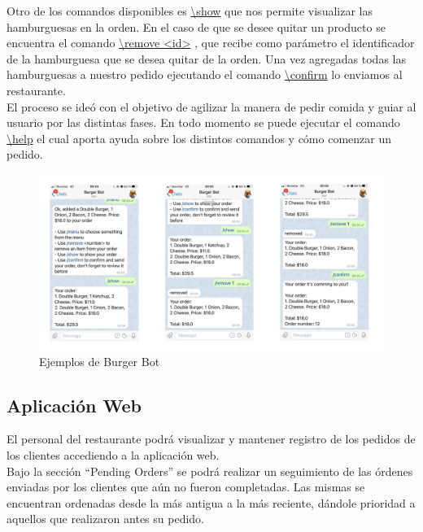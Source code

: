 \documentclass[a4paper,12pt]{article}
\begin{document}
Otro de los comandos disponibles es \color{blue}\uline{\textbackslash show} \color{black} que nos permite visualizar las hamburguesas en la orden. En el caso de que se desee quitar un producto se encuentra el comando
\color{blue}\uline{\textbackslash remove <id>}\color{black}
, que recibe como parámetro el identificador de la hamburguesa que se desea quitar de la orden. Una vez agregadas todas las hamburguesas a nuestro pedido ejecutando el comando 
\color{blue}\uline{\textbackslash confirm} \color{black} 
lo enviamos al restaurante.
\\
El proceso se ideó con el objetivo de agilizar la manera de pedir comida y guiar al usuario por las distintas fases. En todo momento se puede ejecutar el comando 
\color{blue}\uline{\textbackslash help} \color{black}
el cual aporta ayuda sobre los distintos comandos y cómo comenzar un pedido.

\begin{figure}[H]
	\centering
	\includegraphics[width=1.0\linewidth]{ejemplos-chat-bot.jpeg}
	\caption{Ejemplos de Burger Bot}
	\label{fig:Armado hamburguesa chat bot}
\end{figure}

\subsection{Aplicación Web}

El personal del restaurante podrá visualizar y mantener registro de los pedidos de los clientes accediendo a la aplicación web.
\\
Bajo la sección “Pending Orders” se podrá realizar un seguimiento de las órdenes enviadas por los clientes que aún no fueron completadas. Las mismas se encuentran ordenadas desde la más antigua a la más reciente, dándole prioridad a aquellos que realizaron antes su pedido.
\end{document}
